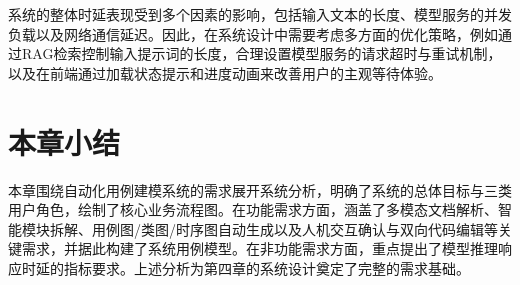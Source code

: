 系统的整体时延表现受到多个因素的影响，包括输入文本的长度、模型服务的并发负载以及网络通信延迟。因此，在系统设计中需要考虑多方面的优化策略，例如通过RAG检索控制输入提示词的长度，合理设置模型服务的请求超时与重试机制，以及在前端通过加载状态提示和进度动画来改善用户的主观等待体验。

\section{本章小结}

本章围绕自动化用例建模系统的需求展开系统分析，明确了系统的总体目标与三类用户角色，绘制了核心业务流程图。在功能需求方面，涵盖了多模态文档解析、智能模块拆解、用例图/类图/时序图自动生成以及人机交互确认与双向代码编辑等关键需求，并据此构建了系统用例模型。在非功能需求方面，重点提出了模型推理响应时延的指标要求。上述分析为第四章的系统设计奠定了完整的需求基础。